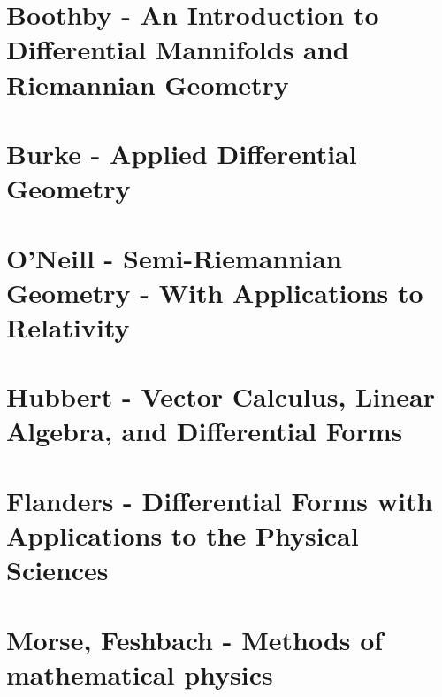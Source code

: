 \documentclass[../main.tex]{subfiles}
\begin{document}
\section{{\sc Boothby} - An Introduction to Differential Mannifolds and Riemannian Geometry}

\section{{\sc Burke} - Applied Differential Geometry}

\section{{\sc O'Neill} - Semi-Riemannian Geometry - With Applications to Relativity}

\section{{\sc Hubbert} - Vector Calculus, Linear Algebra, and Differential Forms}

\section{{\sc Flanders} - Differential Forms with Applications to the Physical Sciences}

\section{{\sc Morse, Feshbach} - Methods of mathematical physics}
\end{document}
